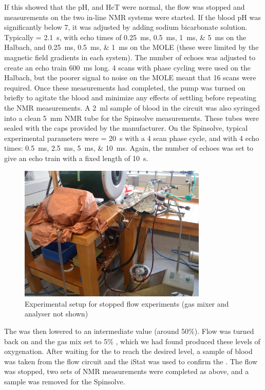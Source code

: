 If this showed that the pH, \SOtwo and HcT were normal, the flow was stopped and measurements on the two in-line NMR systems were started.
If the blood pH was significantly below 7, it was adjusted by adding sodium bicarbonate solution.
Typically \TR = \SI{2.1}{s}, with echo times of \SIlist{0.25;0.5;1;5}{ms} on the Halbach, and \SIlist{0.25; 0.5; 1}{ms} on the MOLE (these were limited by the magnetic field gradients in each system).
The number of echoes was adjusted to create an echo train \SI{600}{ms} long.
4 scans with phase cycling were used on the Halbach, but the poorer signal to noise on the MOLE meant that 16 scans were required.
Once these measurements had completed, the pump was turned on briefly to agitate the blood and minimize any effects of settling before repeating the NMR measurements.
A \SI{2}{ml} sample of blood in the circuit was also syringed into a clean \SI{5}{mm} NMR tube for the Spinsolve measurements.
These tubes were sealed with the caps provided by the manufacturer.
On the Spinsolve, typical experimental parameters were \TR = \SI{20}{s} with a 4 scan phase cycle, and with 4 echo times: \SIlist{0.5;2.5;5;10}{ms}.
Again, the number of echoes was set to give an echo train with a fixed length of \SI{10}{s}.

\begin{figure}[t]
\centering
\includegraphics[width=0.8\textwidth]{figures/stoppedflow/stoppedflowsetup.jpg}
\caption{Experimental setup for stopped flow experiments (gas mixer and analyser not shown)}
\label{fig:sf-stoppedflowsetup}
\end{figure}

The \SOtwo was then lowered to an intermediate value (around 50\%).
Flow was turned back on and the gas mix set to 5\% \Otwo, which we had found produced these levels of oxygenation.
After waiting for the \SOtwo to reach the desired level, a sample of blood was taken from the flow circuit and the iStat was used to confirm the \SOtwo.
The flow was stopped, two sets of NMR measurements were completed as above, and a sample was removed for the Spinsolve.

